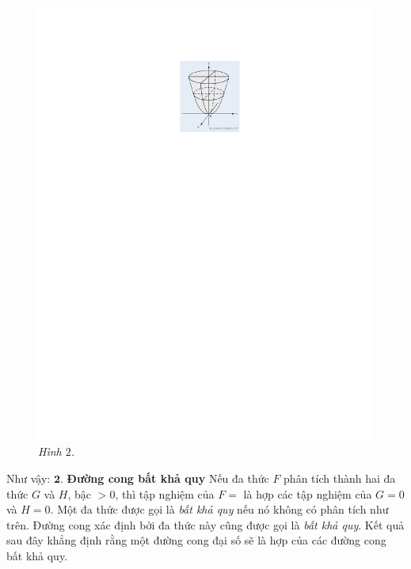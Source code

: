 \begin{multicols}{2}
\begin{figure}[H]
		\vspace*{-5pt}
		\centering
		\captionsetup{labelformat= empty, justification=centering}
		\includegraphics[width= 1\linewidth]{3}
		\caption{\small\textit{\color{duongvaotoanhoc}Hình $2$.}}
		\vspace*{-10pt}
	\end{figure}
	Như vậy:
	\vskip 0.1cm
	\vskip 0.1cm
	$\pmb{2.}$ \textbf{\color{duongvaotoanhoc}Đường cong  bất khả quy}
	\vskip 0.1cm 
	Nếu đa thức $F$ phân tích thành hai đa thức $G$ và $H$, bậc $>0$, thì tập nghiệm của $F=$ là hợp các tập nghiệm của $G=0$ và $H=0$. Một đa thức được gọi là {\em bất khả quy} nếu nó không có phân tích như trên. Đường cong xác định bởi đa thức này cũng được gọi là {\em bất khả quy}. Kết quả sau đây khẳng định rằng một đường cong đại số sẽ là hợp của các đường cong bất khả quy.

\end{multicols}

